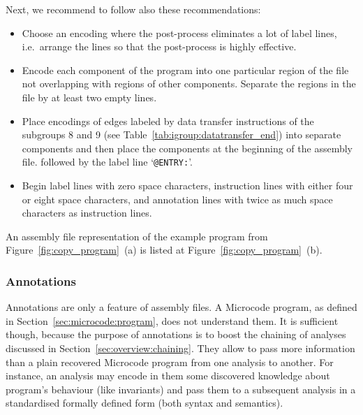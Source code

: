 \documentclass[10pt,twocolumn]{article}
\begin{document}
Next, we recommend to follow also these recommendations:
\begin{itemize}
\item Choose an encoding where the post-process eliminates a lot of label lines,
i.e.~arrange the lines so that the post-process is highly effective. %
\item Encode each component of the program into one particular region of the
file not overlapping with regions of other components. Separate the regions in
the file by at least two empty lines. %
\item Place encodings of edges labeled by data transfer instructions of the
subgroups 8 and 9 (see Table~\ref{tab:igroup:datatransfer_end}) into separate
components and then place the components at the beginning of the assembly file.
followed by the label line `\texttt{@ENTRY:}'. %
\item Begin label lines with zero space characters, instruction lines with
either four or eight space characters, and annotation lines with twice as much
space characters as instruction lines. %
\end{itemize}
%
%

An assembly file representation of the example program from
Figure~\ref{fig:copy_program}~(a) is listed at
Figure~\ref{fig:copy_program}~(b).


\subsubsection{Annotations}
\label{sec:microcode:assembly:annotations}

Annotations are only a feature of assembly files. A Microcode program, as
defined in Section~\ref{sec:microcode:program}, does not understand them. It is
sufficient though, because the purpose of annotations is to boost the chaining
of analyses discussed in Section~\ref{sec:overview:chaining}. They allow to pass
more information than a plain recovered Microcode program from one analysis to
another. For instance, an analysis may encode in them some discovered knowledge
about program's behaviour (like invariants) and pass them to a subsequent
analysis in a standardised formally defined form (both syntax and semantics).
\end{document}
